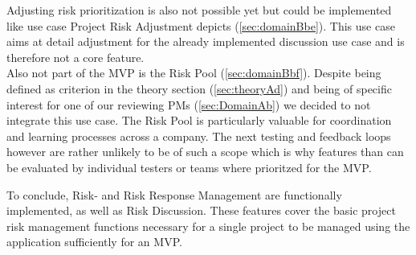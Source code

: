  Adjusting risk prioritization is also not possible yet but could be implemented like use case Project Risk Adjustment depicts (\ref{sec:domainBbe}). This use case aims at detail adjustment for the already implemented discussion use case and is therefore not a core feature.\\
 Also not part of the MVP is the Risk Pool (\ref{sec:domainBbf}). Despite being defined as criterion in the theory section (\ref{sec:theoryAd}) and being of specific interest for one of our reviewing PMs  (\ref{sec:DomainAb}) we decided to not integrate this use case. The Risk Pool is particularly valuable for coordination and learning processes across a company. The next testing and feedback loops however are rather unlikely to be of such a scope which is why features than can be evaluated by individual testers or teams where prioritzed for the \ac{MVP}.

 
 To conclude, Risk- and Risk Response Management are functionally implemented, as well as Risk Discussion. These features cover the basic project risk management functions necessary for a single project to be managed using the application sufficiently for an \ac{MVP}.
 